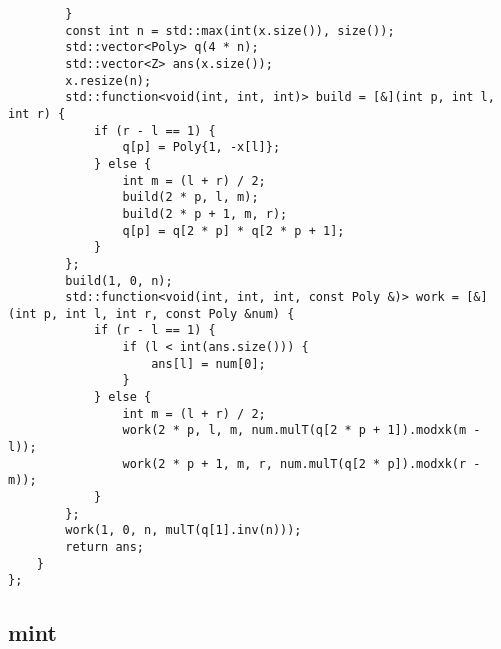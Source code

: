 \documentclass[a4paper,10pt]{article}
\begin{document}
\begin{lstlisting}
        }
        const int n = std::max(int(x.size()), size());
        std::vector<Poly> q(4 * n);
        std::vector<Z> ans(x.size());
        x.resize(n);
        std::function<void(int, int, int)> build = [&](int p, int l, int r) {
            if (r - l == 1) {
                q[p] = Poly{1, -x[l]};
            } else {
                int m = (l + r) / 2;
                build(2 * p, l, m);
                build(2 * p + 1, m, r);
                q[p] = q[2 * p] * q[2 * p + 1];
            }
        };
        build(1, 0, n);
        std::function<void(int, int, int, const Poly &)> work = [&](int p, int l, int r, const Poly &num) {
            if (r - l == 1) {
                if (l < int(ans.size())) {
                    ans[l] = num[0];
                }
            } else {
                int m = (l + r) / 2;
                work(2 * p, l, m, num.mulT(q[2 * p + 1]).modxk(m - l));
                work(2 * p + 1, m, r, num.mulT(q[2 * p]).modxk(r - m));
            }
        };
        work(1, 0, n, mulT(q[1].inv(n)));
        return ans;
    }
};
\end{lstlisting}

\subsection{mint}
\thispagestyle{fancy}
\end{document}
